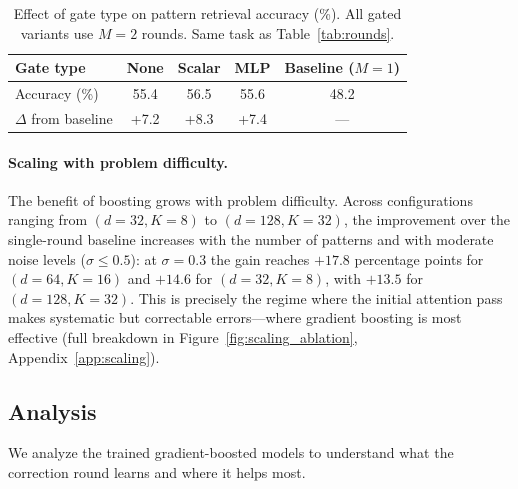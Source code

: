\documentclass{article}
\theoremstyle{definition}
\begin{document}
\begin{table}[t]
\centering
\caption{Effect of gate type on pattern retrieval accuracy (\%). All gated variants use $M{=}2$ rounds. Same task as Table~\ref{tab:rounds}.}
\label{tab:gate}
\begin{tabular}{@{}lcccc@{}}
\toprule
\textbf{Gate type} & None & Scalar & MLP & Baseline ($M{=}1$) \\
\midrule
Accuracy (\%) & 55.4 & 56.5 & 55.6 & 48.2 \\
$\Delta$ from baseline & +7.2 & +8.3 & +7.4 & --- \\
\bottomrule
\end{tabular}
\end{table}

\paragraph{Scaling with problem difficulty.}
The benefit of boosting grows with problem difficulty.
Across configurations ranging from $(d{=}32, K{=}8)$ to $(d{=}128, K{=}32)$, the improvement over the single-round baseline increases with the number of patterns and with moderate noise levels ($\sigma \leq 0.5$): at $\sigma{=}0.3$ the gain reaches $+17.8$ percentage points for $(d{=}64, K{=}16)$ and $+14.6$ for $(d{=}32, K{=}8)$, with $+13.5$ for $(d{=}128, K{=}32)$.
This is precisely the regime where the initial attention pass makes systematic but correctable errors---where gradient boosting is most effective (full breakdown in Figure~\ref{fig:scaling_ablation}, Appendix~\ref{app:scaling}).


\subsection{Analysis}
\label{sec:analysis}

We analyze the trained gradient-boosted models to understand what the correction round learns and where it helps most.
\end{document}
